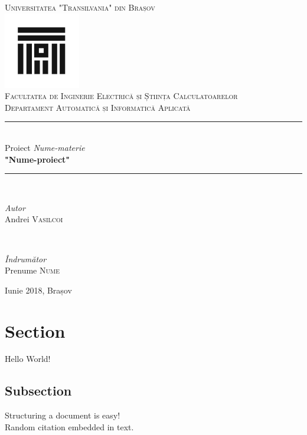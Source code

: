\documentclass{article}
\author{Andrei Vasilcoi}
\begin{document}
\begin{titlepage}

\newcommand{\HRule}{\rule{\linewidth}{0.5mm}}
	
\begin{center}
\textsc{\LARGE Universitatea "Transilvania" din Brașov}\\[0.5cm]
\includegraphics[width=0.25\textwidth]{logo_ut.jpg}\\[0.5cm]
\textsc{\Large Facultatea de Inginerie Electrică și Știința Calculatoarelor}\\[0.5cm]
\textsc{\large Departament Automatică și Informatică Aplicată}\\[1.5cm]
\HRule\\[0.5cm]
{\Large Proiect \textit{Nume-materie}}\\[0.5cm]
{\LARGE\bfseries "Nume-proiect"}\\[0.5cm]
\HRule\\[1.5cm]
	
\begin{minipage}{0.4\textwidth}
	\begin{flushleft}
		\large
		\textit{Autor}\\
		Andrei \textsc{Vasilcoi}\\
	\end{flushleft}
\end{minipage}
~
\begin{minipage}{0.4\textwidth}
	\begin{flushright}
		\large
		\textit{Îndrumător}\\
		Prenume \textsc{Nume}
	\end{flushright}
\end{minipage}
\vfill
{\large Iunie 2018, Brașov}\\[1cm]
\end{center}
\end{titlepage}

\newpage
{}
\tableofcontents

\newpage	
\section{Section}

Hello World!

\subsection{Subsection}

Structuring a document is easy!\\
Random citation \cite{DUMMY:1} embedded in text.

\newpage

 

\end{document}
